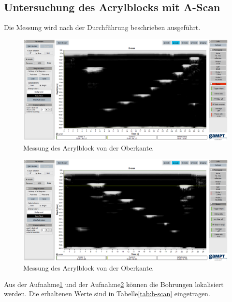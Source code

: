 \subsection{Untersuchung des Acrylblocks mit A-Scan}
Die Messung wird nach der Durchführung beschrieben ausgeführt.
\begin{figure}[H]
  \centering
  \includegraphics[width=\textwidth]{content/bscan-2mhz_oberseite.png}
  \caption{Messung des Acrylblock von der Oberkante.}
  \label{fig:obs}
\end{figure}
\begin{figure}[H]
  \centering
  \includegraphics[width=\textwidth]{content/bscan-2mhz_unterseite.png}
  \caption{Messung des Acrylblock von der Oberkante.}
  \label{fig:unts}
\end{figure}
Aus der Aufnahme\ref{fig:obs} und der Aufnahme\ref{fig:unts} können die Bohrungen lokalisiert werden.
Die erhaltenen Werte sind in Tabelle\ref{tab:b-scan} eingetragen.
